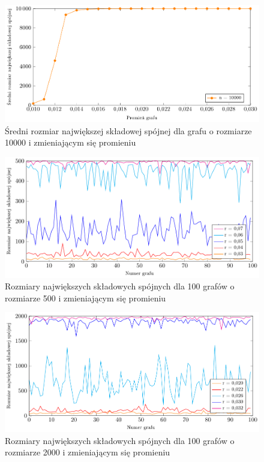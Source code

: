 		\begin{figure}
			\centering
			\includegraphics[scale=0.8]{10000-0_0:3_0-max_comps_sizes_means.pdf}
			\caption{Średni rozmiar największej składowej spójnej dla grafu o rozmiarze 10000 i zmieniającym się promieniu}
			\label{10000-0_0:3_0-max_comps_sizes_means}
		\end{figure}

		\begin{figure}
			\centering
			\includegraphics[scale=0.8]{500-max_comps_sizes.pdf}
			\caption{Rozmiary największych składowych spójnych dla 100 grafów o rozmiarze 500 i zmieniającym się promieniu}
			\label{500-max_comps_sizes}
		\end{figure}

		\begin{figure}
			\centering
			\includegraphics[scale=0.8]{2000-max_comps_sizes.pdf}
			\caption{Rozmiary największych składowych spójnych dla 100 grafów o rozmiarze 2000 i zmieniającym się promieniu}
			\label{2000-max_comps_sizes}
		\end{figure}

